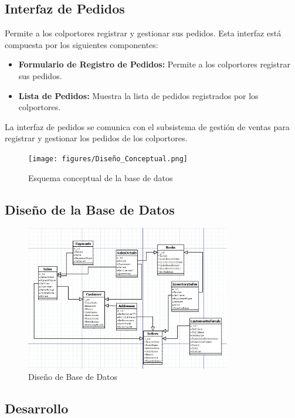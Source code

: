 \documentclass[runningheads]{llncs}
\begin{document}
\subsection*{Interfaz de Pedidos}
Permite a los colportores registrar y gestionar sus pedidos. Esta interfaz está compuesta por los siguientes componentes:
\begin{itemize}
    \item \textbf{Formulario de Registro de Pedidos:}  Permite a los colportores registrar sus pedidos.
    \item \textbf{Lista de Pedidos:} Muestra la lista de pedidos registrados por los colportores.
\end{itemize}
La interfaz de pedidos se comunica con el subsistema de gestión de ventas para registrar y gestionar los pedidos de los colportores.
\begin{figure}[H]
	\centering\captionsetup{width=0.8\textwidth}
	\texttt{[image: figures/Diseño\_Conceptual.png]}
	\caption{Esquema conceptual de la base de datos} \label{fig5}
\end{figure}
\subsection*{Diseño de la Base de Datos}

\begin{figure}[H]
	\centering\captionsetup{width=0.8\textwidth}
	\includegraphics[width=0.8\textwidth]{figures/db_diagrams/DB Diagram.jpg}
	\caption{Diseño de Base de Datos} \label{fig6}
\end{figure}

\subsection{Desarrollo}
\end{document}
